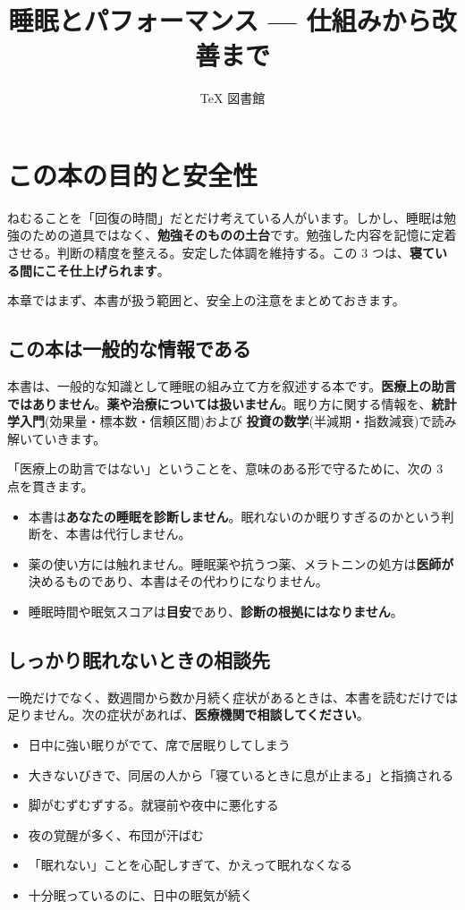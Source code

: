 \documentclass{article}
\title{睡眠とパフォーマンス — 仕組みから改善まで}
\author{TeX 図書館}
\begin{document}
\section{この本の目的と安全性}

ねむることを「回復の時間」だとだけ考えている人がいます。しかし、睡眠は勉強のための道具ではなく、\textbf{勉強そのものの土台}です。勉強した内容を記憶に定着させる。判断の精度を整える。安定した体調を維持する。この 3 つは、\textbf{寝ている間にこそ仕上げられます}。

本章ではまず、本書が扱う範囲と、安全上の注意をまとめておきます。

\subsection{この本は一般的な情報である}

本書は、一般的な知識として睡眠の組み立て方を叙述する本です。\textbf{医療上の助言ではありません}。\textbf{薬や治療については扱いません}。眠り方に関する情報を、\textbf{統計学入門}(効果量・標本数・信頼区間)および \textbf{投資の数学}(半減期・指数減衰)で読み解いていきます。

「医療上の助言ではない」ということを、意味のある形で守るために、次の 3 点を貫きます。

\begin{itemize}
\item 本書は\textbf{あなたの睡眠を診断しません}。眠れないのか眠りすぎるのかという判断を、本書は代行しません。
\item 薬の使い方には触れません。睡眠薬や抗うつ薬、メラトニンの処方は\textbf{医師が}決めるものであり、本書はその代わりになりません。
\item 睡眠時間や眠気スコアは\textbf{目安}であり、\textbf{診断の根拠にはなりません}。
\end{itemize}

\subsection{しっかり眠れないときの相談先}

一晩だけでなく、数週間から数か月続く症状があるときは、本書を読むだけでは足りません。次の症状があれば、\textbf{医療機関で相談してください}。

\begin{itemize}
\item 日中に強い眠りがでて、席で居眠りしてしまう
\item 大きないびきで、同居の人から「寝ているときに息が止まる」と指摘される
\item 脚がむずむずする。就寝前や夜中に悪化する
\item 夜の覚醒が多く、布団が汗ばむ
\item 「眠れない」ことを心配しすぎて、かえって眠れなくなる
\item 十分眠っているのに、日中の眠気が続く
\end{itemize}
\end{document}

